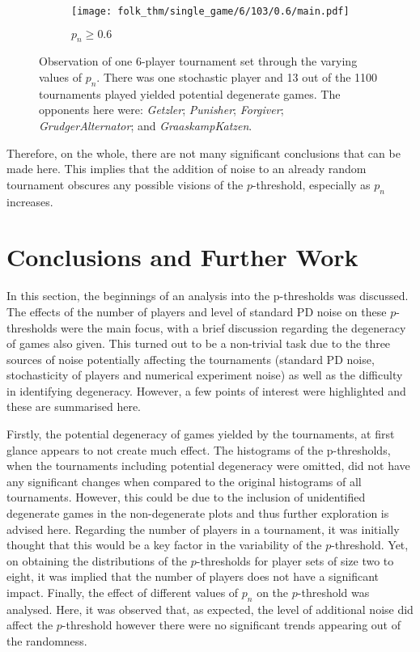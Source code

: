 \begin{figure}
    \vspace{5pt}

    \begin{subfigure}{0.45\textwidth}
        \centering
        \texttt{[image: folk\_thm/single\_game/6/103/0.6/main.pdf]}
        \caption{\(p_{n} \ge 0.6\)}
    \end{subfigure}
    \caption{Observation of one 6-player tournament set through the varying
    values of \(p_{n}\). There was one stochastic player and 13 out of
    the 1100 tournaments played yielded potential degenerate games. The opponents here were: \textit{Getzler};
    \textit{Punisher}; \textit{Forgiver}; \textit{GrudgerAlternator}; and \textit{GraaskampKatzen}.}\label{fig:single_set_vary_noise}
\end{figure}


Therefore, on the whole, there
are not many significant conclusions that can be made here. This implies that
the addition of noise to an already random tournament obscures any possible
visions of the \(p\)-threshold, especially as \(p_{n}\) increases.

\newpage
\section{Conclusions and Further Work}\label{sec:Conclusions_and_Further_Work}
In this section, the beginnings of an analysis into the p-thresholds was
discussed. The effects of the number of players and level of standard PD noise on
these \(p\)-thresholds were the main focus, with a brief discussion regarding the
degeneracy of games also given. This turned out to be a non-trivial task due to
the three sources of noise potentially affecting the tournaments (standard PD
noise, stochasticity of players and numerical experiment noise) as well as the
difficulty in identifying degeneracy. However, a few points of interest were highlighted and these are
summarised here. 

Firstly, the potential degeneracy of games yielded by the tournaments, at first
glance appears to not create much effect. The histograms of the p-thresholds, when the
tournaments including potential degeneracy were omitted, did not have any
significant changes when compared to the original histograms of all tournaments.
However, this could be due to the inclusion of unidentified degenerate games in
the non-degenerate plots and thus further exploration is advised here. Regarding the number of players in
a tournament, it was initially thought that this would be a key factor in
the variability of the \(p\)-threshold. Yet, on obtaining the distributions of
the \(p\)-thresholds for player sets of size two
to eight, it was implied that the number of players does not have a significant
impact. Finally, the effect of different values of \(p_{n}\) on
the \(p\)-threshold was analysed. Here, it was observed that, as expected, the level
of additional noise did affect the \(p\)-threshold however there were no significant
trends appearing out of the randomness.


